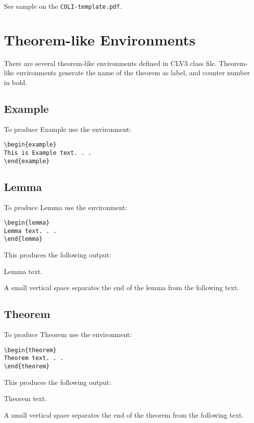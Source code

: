 \documentclass[manuscript]{clv3}
\begin{document}
\noindent See sample on the {\tt COLI-template.pdf}.

\section{Theorem-like Environments}

There are several theorem-like environments defined in CLV3 class file. Theorem-like
environments generate the name of the theorem as label, and counter number in bold.

\subsection{Example}

To produce Example use the environment:

\begin{verbatim}
\begin{example}
This is Example text. . .
\end{example}
\end{verbatim}

\subsection{Lemma}

To produce Lemma use the environment:

\begin{verbatim}
\begin{lemma}
Lemma text. . .
\end{lemma}
\end{verbatim}

This produces the following output:
\begin{lemma}\label{lem}
Lemma text.
\end{lemma}
A small vertical space separates the end of the lemma
from the following text.

\subsection{Theorem}

To produce Theorem use the environment:

\begin{verbatim}
\begin{theorem}
Theorem text. . .
\end{theorem}
\end{verbatim}

This produces the following output:
\begin{theorem}\label{thm}
Theorem text.
\end{theorem}
\noindent
A small vertical space separates the end of the theorem
from the following text.
\end{document}
